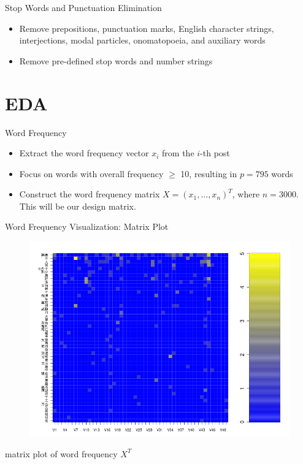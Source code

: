 \documentclass[12pt]{beamer}
\newcommand{\1}[1]{{\mathbf 1}\left\{#1\right\}}        %
\begin{document}
\begin{frame}{Stop Words and Punctuation Elimination}

\begin{itemize}[<+->]
\item Remove prepositions, punctuation marks, English character strings, interjections, modal particles, onomatopoeia, and auxiliary words
\item Remove pre-defined stop words and number strings
\end{itemize}

\end{frame}



\section{EDA}


\begin{frame}{Word Frequency}
\begin{itemize}[<+->]
\item Extract the word frequency vector $x_i$ from the $i$-th post
\item Focus on words with overall frequency $\geq$ 10, resulting in $p=795$ words
\item Construct the word frequency matrix $X=(x_1,...,x_n)^T$, where $n=3000$. This will be our design matrix.
\end{itemize}
\end{frame}


\begin{frame}{Word Frequency Visualization: Matrix Plot}

\begin{figure}
  \centering
  \includegraphics[height=0.9\textheight]{./../../wordFreqMat.png} 
\end{figure}
\center matrix plot of word frequency $X^T$

\end{frame}
\end{document}
